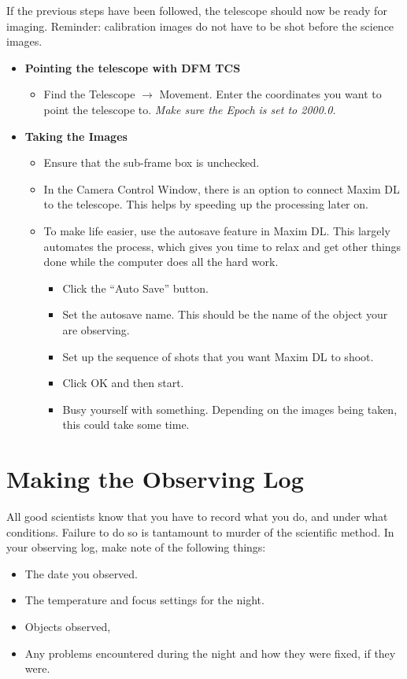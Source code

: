 \documentclass[letterpaper, 12pt]{report}
\begin{document}
If the previous steps have been followed, the telescope should now be ready for imaging. Reminder: calibration images do not have to be shot before the science images.

\begin{itemize}
	\item {\large \textbf{Pointing the telescope with DFM TCS}}
	\begin{itemize}
		\item Find the Telescope $\rightarrow$ Movement. Enter the coordinates you want to point the telescope to. {\large \emph{Make sure the Epoch is set to 2000.0.}}
	\end{itemize}
	\item {\large \textbf{Taking the Images}}
	\begin{itemize}
		\item Ensure that the sub-frame box is unchecked.
		\item In the Camera Control Window, there is an option to connect Maxim DL to the telescope. This helps by speeding up the processing later on.
		\item To make life easier, use the autosave feature in Maxim DL. This largely automates the process, which gives you time to relax and get other things done while the computer does all the hard work.
		\begin{itemize}
			\item Click the ``Auto Save'' button.
			\item Set the autosave name. This should be the name of the object your are observing.
			\item Set up the sequence of shots that you want Maxim DL to shoot.
			\item Click OK and then start.
			\item Busy yourself with something. Depending on the images being taken, this could take some time.
		\end{itemize}
	\end{itemize}
\end{itemize}

\newpage

\chapter{Making the Observing Log}\label{ch:log}
All good scientists know that you have to record what you do, and under what conditions. Failure to do so is tantamount to murder of the scientific method. In your observing log, make note of the following things:
\begin{itemize}
	\item The date you observed.
	\item The temperature and focus settings for the night.
	\item Objects observed,
	\item Any problems encountered during the night and how they were fixed, if they were.
\end{itemize}
\end{document}
